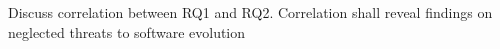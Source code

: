Discuss correlation between RQ1 and RQ2. Correlation shall reveal findings on neglected threats to software evolution